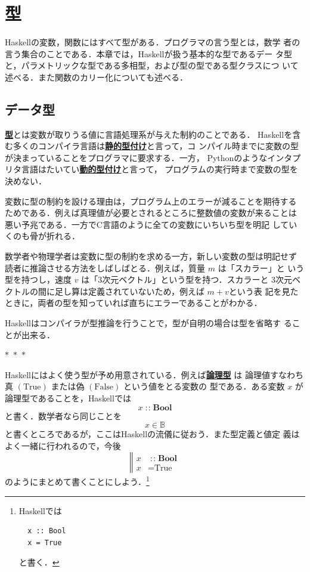 \documentclass[a5paper,twoside,fleqn,draft]{jsbook}
\newcommand{\separator}{\begin{center}$*$~$*$~$*$\end{center}}
\newcommand{\programminglanguage}[1]{\textsf{#1}}
\newcommand{\clang}{\programminglanguage{C}}
\newcommand{\haskell}{\programminglanguage{Haskell}}
\newcommand{\python}{\programminglanguage{Python}}
\newenvironment{leader}{\begingroup\gt}{\endgroup}
\newcommand{\keyword}[1]{{\underline{\textbf{#1}}}}
\newcommand{\mBrace}{\Vert}
\newcommand{\mSpecialConstant}[1]{\textrm{#1}}
\newcommand{\mFalse}{\mSpecialConstant{False}}
\newcommand{\mTrue}{\mSpecialConstant{True}}
\DeclareMathOperator{\mIn}{{:\!:}}
\newcommand{\mSpecialSet}[1]{\mathbb{#1}}
\newcommand{\mBSet}{\mSpecialSet{B}}
\newcommand{\mType}[1]{\mathbf{#1}} %
\newcommand{\mBoolType}{\mType{Bool}}
\begin{document}
\chapter{型}
\label{ch:type}

\begin{leader}
\haskell の変数，関数にはすべて型がある．プログラマの言う型とは，数学
者の言う集合のことである．本章では，\haskell が扱う基本的な型であるデー
タ型と，パラメトリックな型である多相型，および型の型である型クラスにつ
いて述べる．また関数のカリー化についても述べる．
\end{leader}

\section{データ型}

\keyword{型}とは変数が取りうる値に言語処理系が与えた制約のことである．
\haskell を含む多くのコンパイラ言語は\keyword{静的型付け}と言って，コ
ンパイル時までに変数の型が決まっていることをプログラマに要求する．一方，
\python のようなインタプリタ言語はたいてい\keyword{動的型付け}と言って，
プログラムの実行時まで変数の型を決めない．

変数に型の制約を設ける理由は，プログラム上のエラーが減ることを期待する
ためである．例えば真理値が必要とされるところに整数値の変数が来ることは
悪い予兆である．一方で\clang 言語のように全ての変数にいちいち型を明記
していくのも骨が折れる．

数学者や物理学者は変数に型の制約を求める一方，新しい変数の型は明記せず
読者に推論させる方法をしばしばとる．例えば，質量 $m$ は「スカラー」と
いう型を持つし，速度 $v$ は「3次元ベクトル」という型を持つ．スカラーと
3次元ベクトルの間に足し算は定義されていないため，例えば $m+v$という表
記を見たときに，両者の型を知っていれば直ちにエラーであることがわかる．

\haskell はコンパイラが型推論を行うことで，型が自明の場合は型を省略す
ることが出来る．

\separator

\haskell にはよく使う型が予め用意されている．例えば\keyword{論理型} は
論理値すなわち真 $(\mTrue)$ または偽 $(\mFalse)$ という値をとる変数の
型である．ある変数 $x$ が論理型であることを，\haskell では
\begin{equation}
  x
  \mIn\mBoolType
\end{equation}
と書く．数学者なら同じことを
\begin{equation}
  x
  \in\mBSet
\end{equation}
と書くところであるが，ここは\haskell の流儀に従おう．また型定義と値定
義はよく一緒に行われるので，今後
\begin{equation}
  \left\mBrace
  \begin{aligned}
    x
    &\mIn\mBoolType\\
    x
    &=\mTrue
  \end{aligned}
  \right.
\end{equation}
のようにまとめて書くことにしよう．\footnote{\haskell では
\begin{verbatim}
  x :: Bool
  x = True
\end{verbatim}
と書く．}
\end{document}
